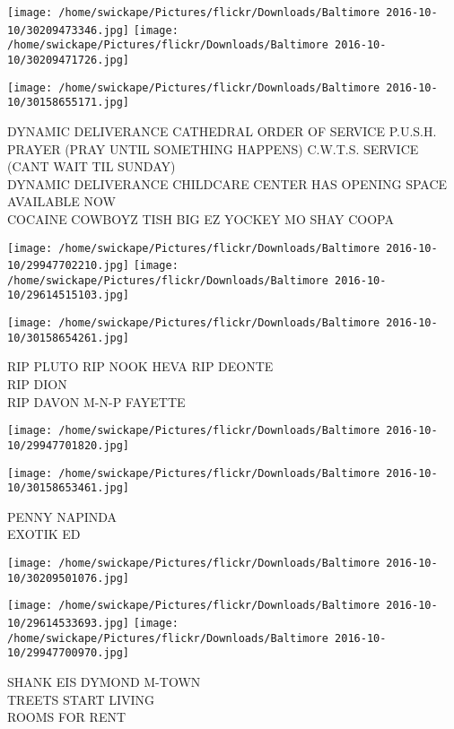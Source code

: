 \documentclass[10pt,letterpaper]{article}
\begin{document}
\texttt{[image: /home/swickape/Pictures/flickr/Downloads/Baltimore 2016-10-10/30209473346.jpg]}
\texttt{[image: /home/swickape/Pictures/flickr/Downloads/Baltimore 2016-10-10/30209471726.jpg]}

\vspace{0.25in}
\texttt{[image: /home/swickape/Pictures/flickr/Downloads/Baltimore 2016-10-10/30158655171.jpg]}

DYNAMIC DELIVERANCE CATHEDRAL ORDER OF SERVICE P.U.S.H. PRAYER (PRAY UNTIL SOMETHING HAPPENS) C.W.T.S. SERVICE (CANT WAIT TIL SUNDAY)\\
DYNAMIC DELIVERANCE CHILDCARE CENTER HAS OPENING  SPACE AVAILABLE NOW\\
COCAINE COWBOYZ TISH BIG EZ YOCKEY MO SHAY COOPA\\
\pagebreak

\texttt{[image: /home/swickape/Pictures/flickr/Downloads/Baltimore 2016-10-10/29947702210.jpg]}
\texttt{[image: /home/swickape/Pictures/flickr/Downloads/Baltimore 2016-10-10/29614515103.jpg]}

\texttt{[image: /home/swickape/Pictures/flickr/Downloads/Baltimore 2016-10-10/30158654261.jpg]}

RIP PLUTO RIP NOOK HEVA RIP DEONTE\\
RIP DION\\
RIP DAVON M{-}N{-}P FAYETTE\\
\pagebreak

\texttt{[image: /home/swickape/Pictures/flickr/Downloads/Baltimore 2016-10-10/29947701820.jpg]}

\vspace{0.25in}
\texttt{[image: /home/swickape/Pictures/flickr/Downloads/Baltimore 2016-10-10/30158653461.jpg]}

PENNY NAPINDA\\
EXOTIK ED\\
\pagebreak

\texttt{[image: /home/swickape/Pictures/flickr/Downloads/Baltimore 2016-10-10/30209501076.jpg]}

\vspace{0.25in}
\texttt{[image: /home/swickape/Pictures/flickr/Downloads/Baltimore 2016-10-10/29614533693.jpg]}
\texttt{[image: /home/swickape/Pictures/flickr/Downloads/Baltimore 2016-10-10/29947700970.jpg]}

SHANK EIS DYMOND M{-}TOWN\\
TREETS START LIVING\\
ROOMS FOR RENT\\
\pagebreak
\end{document}
